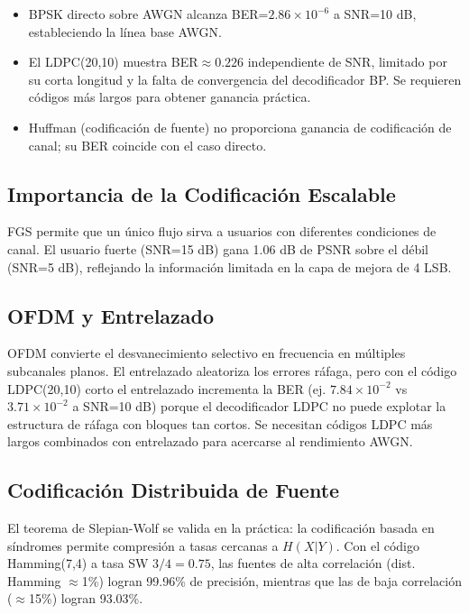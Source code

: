 \documentclass[12pt, a4paper]{article}
\begin{document}
\begin{itemize}
    \item BPSK directo sobre AWGN alcanza BER=$2.86\times10^{-6}$ a SNR=10 dB, estableciendo la l\'inea base AWGN.
    \item El LDPC(20,10) muestra BER$\approx 0.226$ independiente de SNR, limitado por su corta longitud y la falta de convergencia del decodificador BP. Se requieren c\'odigos m\'as largos para obtener ganancia pr\'actica.
    \item Huffman (codificaci\'on de fuente) no proporciona ganancia de codificaci\'on de canal; su BER coincide con el caso directo.
\end{itemize}

\subsection{Importancia de la Codificaci\'on Escalable}

FGS permite que un \'unico flujo sirva a usuarios con diferentes condiciones de canal. El usuario fuerte (SNR=15 dB) gana 1.06 dB de PSNR sobre el d\'ebil (SNR=5 dB), reflejando la informaci\'on limitada en la capa de mejora de 4 LSB.

\subsection{OFDM y Entrelazado}

OFDM convierte el desvanecimiento selectivo en frecuencia en m\'ultiples subcanales planos. El entrelazado aleatoriza los errores r\'afaga, pero con el c\'odigo LDPC(20,10) corto el entrelazado incrementa la BER (ej. $7.84\times10^{-2}$ vs $3.71\times10^{-2}$ a SNR=10 dB) porque el decodificador LDPC no puede explotar la estructura de r\'afaga con bloques tan cortos. Se necesitan c\'odigos LDPC m\'as largos combinados con entrelazado para acercarse al rendimiento AWGN.

\subsection{Codificaci\'on Distribuida de Fuente}

El teorema de Slepian-Wolf se valida en la pr\'actica: la codificaci\'on basada en s\'indromes permite compresi\'on a tasas cercanas a $H(X|Y)$. Con el c\'odigo Hamming(7,4) a tasa SW $3/4=0.75$, las fuentes de alta correlaci\'on (dist. Hamming $\approx$1\%) logran 99.96\% de precisi\'on, mientras que las de baja correlaci\'on ($\approx$15\%) logran 93.03\%.
\end{document}
